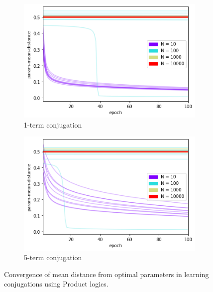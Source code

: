 \begin{figure}[h]
    \centering
    \begin{subfigure}[b]{0.48\textwidth}
        \centering
        \includegraphics[width=\textwidth]{imgs/conj-pmd-prod-nokeepn-1t.png}
        \caption{1-term conjugation}
        \label{fig:conjconvnokeepn1}
    \end{subfigure}
    \begin{subfigure}[b]{0.48\textwidth}
        \centering
        \includegraphics[width=\textwidth]{imgs/conj-pmd-prod-nokeepn-5t.png}
        \caption{5-term conjugation}
        \label{fig:conjconvnokeepn5}
    \end{subfigure}
       \caption{Convergence of mean distance from optimal parameters in learning conjugations using Product logics.}
       \label{fig:conjconvnokeepn}
\end{figure}



